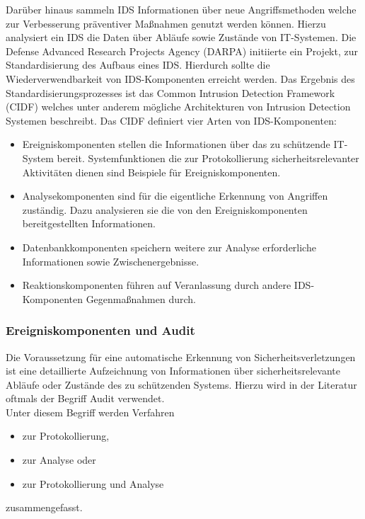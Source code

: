 \documentclass[11pt]{scrartcl}
\begin{document}
Darüber hinaus sammeln IDS Informationen über neue Angriffsmethoden welche zur Verbesserung präventiver Maßnahmen genutzt werden können. Hierzu analysiert ein IDS die Daten über Abläufe sowie Zustände von IT-Systemen. Die Defense Advanced Research Projects Agency (DARPA) initiierte ein Projekt, zur Standardisierung des Aufbaus eines IDS. Hierdurch sollte die Wiederverwendbarkeit von IDS-Komponenten erreicht werden. Das Ergebnis des Standardisierungsprozesses ist das Common Intrusion Detection Framework (CIDF) \cite{7} welches unter anderem mögliche Architekturen von Intrusion Detection Systemen beschreibt. 
Das CIDF definiert vier Arten von IDS-Komponenten:\\
\begin{itemize}
\item Ereigniskomponenten stellen die Informationen über das zu schützende IT-System
bereit. Systemfunktionen die zur Protokollierung sicherheitsrelevanter
Aktivitäten dienen sind Beispiele für Ereigniskomponenten.

\item Analysekomponenten sind für die eigentliche Erkennung von Angriffen zuständig.
Dazu analysieren sie die von den Ereigniskomponenten bereitgestellten
Informationen.

\item Datenbankkomponenten speichern weitere zur Analyse erforderliche Informationen
sowie Zwischenergebnisse.

\item Reaktionskomponenten führen auf Veranlassung durch andere IDS-Komponenten
Gegenmaßnahmen durch.
\end{itemize}

\subsubsection{Ereigniskomponenten und Audit}
\label{sec:ereignis und audit}

Die Voraussetzung für eine automatische Erkennung von Sicherheitsverletzungen
ist eine detaillierte Aufzeichnung von Informationen über sicherheitsrelevante Abläufe
oder Zustände des zu schützenden Systems. Hierzu wird in der Literatur oftmals der Begriff Audit verwendet.\\
Unter diesem Begriff werden Verfahren
\begin{itemize}
\item zur Protokollierung,
\item zur Analyse oder
\item zur Protokollierung und Analyse
\end{itemize}
zusammengefasst.
\end{document}
